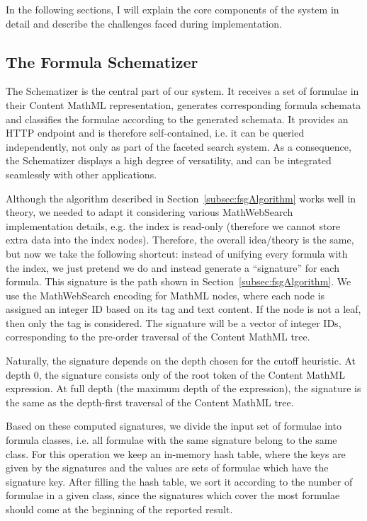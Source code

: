 \documentclass[a4paper,oneside]{article}
\def\mws{\textsf{MathWebSearch}\xspace}
\def\cmml{\textsf{Content MathML}\xspace}
\def\mathml{\textsf{MathML}\xspace}
\begin{document}
In the following sections, I will explain the core components of
the system in detail and describe the challenges faced during
implementation.

\subsection{The Formula Schematizer}\label{subsec:fschematizer}
The Schematizer is the central part of our system. It receives a set of
formulae in their \cmml representation, generates corresponding formula
schemata and classifies the formulae according to the generated schemata.
It provides an HTTP endpoint and is therefore self-contained, i.e. it can be
queried independently, not only as part of the faceted search system.
As a consequence, the Schematizer displays a high degree of versatility,
and can be integrated seamlessly with other applications.

Although the algorithm described in Section~\ref{subsec:fsgAlgorithm} works
well in theory, we needed to adapt it considering various \mws implementation
details, e.g. the index is read-only (therefore we cannot store extra data into
the index nodes). Therefore, the overall idea/theory is the same, but now we take the
following shortcut: instead of unifying every formula with the index, we just
pretend we do and instead generate a ``signature'' for each formula. This
signature is the path shown in Section~\ref{subsec:fsgAlgorithm}. We use the
\mws encoding for \mathml nodes, where each node is assigned an integer ID
based on its tag and text content. If the node is not a leaf, then only the tag
is considered. The signature will be a vector of integer IDs, corresponding to
the pre-order traversal of the \cmml tree.

Naturally, the signature depends on the depth chosen for the cutoff heuristic.
At depth 0, the signature consists only of the root token of the \cmml
expression. At full depth (the maximum depth of the expression), the signature
is the same as the depth-first traversal of the \cmml tree.

Based on these computed signatures, we divide the input set of formulae into
formula classes, i.e. all formulae with the same signature belong to the same
class. For this operation we keep an in-memory hash table, where the keys are
given by the signatures and the values are sets of formulae which have the
signature key. After filling the hash table, we sort it according to the number
of formulae in a given class, since the signatures which cover the most
formulae should come at the beginning of the reported result.
\end{document}
